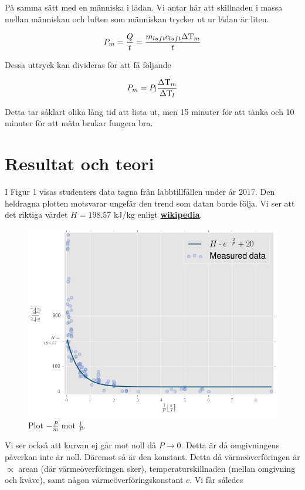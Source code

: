 \documentclass[11pt]{article}
\begin{document}
På samma sätt med en människa i lådan. Vi antar här att skillnaden i massa mellan människan och luften som människan trycker ut ur lådan är liten.

\begin{equation*}
    P_m = \frac{Q}{t} = \frac{m_{luft} c_{luft} \Delta \text T_m}{t}
\end{equation*}

Dessa uttryck kan divideras för att få följande

\begin{equation*}
    P_m = P_l \frac{\Delta \text T_m}{\Delta \text T_l}
\end{equation*}

Detta tar såklart olika lång tid att lista ut, men 15 minuter för att tänka och 10 minuter för att mäta brukar fungera bra.

\section{Resultat och teori}

I Figur 1 visas studenters data tagna från labbtillfällen under år 2017. Den heldragna plotten motsvarar ungefär den trend som datan borde följa. Vi ser att det riktiga värdet $H = 198.57$ kJ/kg enligt \href{https://en.wikipedia.org/wiki/Nitrogen}{\textbf{wikipedia}}.

\begin{figure}[h]
\center
    \includegraphics[width = .75\linewidth]{nitrogenEnthalpy.png}
    \caption{Plot $- \frac{P}{\dot m}$ mot $\frac{1}{P}$.}
\end{figure}

Vi ser också att kurvan ej går mot noll då $P \to 0$. Detta är då omgivningens påverkan inte är noll. Däremot så är den konstant. Detta då värmeöverföringen är $\propto$ arean (där värmeöverföringen sker), temperaturskillnaden (mellan omgivning och kväve), samt någon värmeöverföringskonstant $c$. Vi får således
\end{document}
